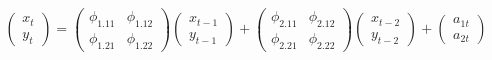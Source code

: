 

\[
\left( \begin{array}{c} x_{t} \\ y_{t} \end{array} \right) = \left( \begin{array}{cc} \phi_{1.11} & \phi_{1.12} \\ \phi_{1.21} & \phi_{1.22} \end{array} \right)  \left( \begin{array}{c}  x_{t-1} \\ y_{t-1} \end{array} \right)  + \left( \begin{array}{cc} \phi_{2.11} & \phi_{2.12} \\ \phi_{2.21} & \phi_{2.22} \end{array} \right)  \left( \begin{array}{c}  x_{t-2} \\ y_{t-2} \end{array} \right)  + \left( \begin{array}{c} a_{1t} \\ a_{2t} \end{array} \right)
\]


